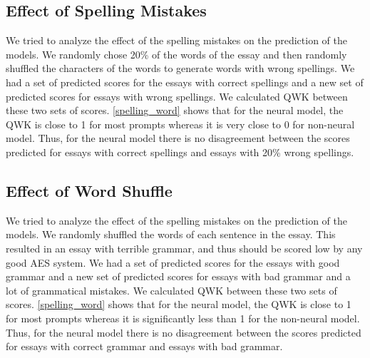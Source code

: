 \documentclass[11pt,a4paper]{article}
\begin{document}
\begin{table}[]
  \centering
\caption{Effect of Length}
\label{length}
\end{table}

\subsection{Effect of Spelling Mistakes}
We tried to analyze the effect of the spelling mistakes on the prediction of the models. We randomly chose 20\% of the words of the essay and then randomly shuffled the characters of the words to generate words with wrong spellings. We had a set of predicted scores for the essays with correct spellings and a new set of predicted scores for essays with wrong spellings. We calculated QWK between these two sets of scores. \cref{spelling_word} shows that for the neural model, the QWK is close to 1 for most prompts whereas it is very close to 0 for non-neural model. Thus, for the neural model there is no disagreement between the scores predicted for essays with correct spellings and essays with 20\% wrong spellings.

\subsection{Effect of Word Shuffle}
We tried to analyze the effect of the spelling mistakes on the prediction of the models. We randomly shuffled the words of each sentence in the essay. This resulted in an essay with terrible grammar, and thus should be scored low by any good AES system. We had a set of predicted scores for the essays with good grammar and a new set of predicted scores for essays with bad grammar and a lot of grammatical mistakes. We calculated QWK between these two sets of scores. \cref{spelling_word} shows that for the neural model, the QWK is close to 1 for most prompts whereas it is significantly less than 1 for the non-neural model. Thus, for the neural model there is no disagreement between the scores predicted for essays with correct grammar and essays with bad grammar.
\end{document}
